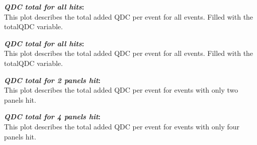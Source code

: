 \documentclass[a4paper,12pt]{article}
\begin{document}
\textbf{\emph{QDC total for all hits}:} \\
This plot describes the total added QDC per event for all events. Filled with the totalQDC variable.

\pagebreak
\begin{figure}[h]
\centering
{}%
\end{figure}

\textbf{\emph{QDC total for all hits}:} \\
This plot describes the total added QDC per event for all events. Filled with the totalQDC variable.

\textbf{\emph{QDC total for 2 panels hit}:} \\
This plot describes the total added QDC per event for events with only two panels hit.

\textbf{\emph{QDC total for 4 panels hit}:} \\
This plot describes the total added QDC per event for events with only four panels hit.

\pagebreak
\begin{figure}[h]
\centering
{}%
\end{figure}
\end{document}
